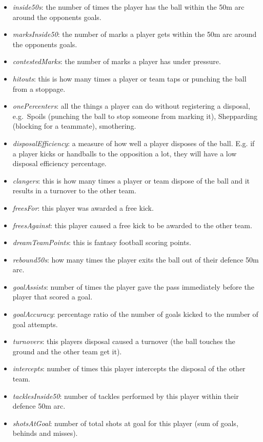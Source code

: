 \begin{itemize}
\item
  \emph{inside50s}: the number of times the player has the ball within the 50m arc around the opponents goals.
\item
  \emph{marksInside50}: the number of marks a player gets within the 50m arc around the opponents goals.
\item
  \emph{contestedMarks}: the number of marks a player has under pressure.
\item
  \emph{hitouts}: this is how many times a player or team taps or punching the ball from a stoppage.
\item
  \emph{onePercenters}: all the things a player can do without registering a disposal, e.g.~Spoils (punching the ball to stop someone from marking it), Shepparding (blocking for a teammate), smothering.
\item
  \emph{disposalEfficiency}: a measure of how well a player disposes of the ball. E.g. if a player kicks or handballs to the opposition a lot, they will have a low disposal efficiency percentage.
\item
  \emph{clangers}: this is how many times a player or team dispose of the ball and it results in a turnover to the other team.
\item
  \emph{freesFor}: this player was awarded a free kick.
\item
  \emph{freesAgainst}: this player caused a free kick to be awarded to the other team.
\item
  \emph{dreamTeamPoints}: this is fantasy football scoring points.
\item
  \emph{rebound50s}: how many times the player exits the ball out of their defence 50m arc.
\item
  \emph{goalAssists}: number of times the player gave the pass immediately before the player that scored a goal.
\item
  \emph{goalAccuracy}: percentage ratio of the number of goals kicked to the number of goal attempts.
\item
  \emph{turnovers}: this players disposal caused a turnover (the ball touches the ground and the other team get it).
\item
  \emph{intercepts}: number of times this player intercepts the disposal of the other team.
\item
  \emph{tacklesInside50}: number of tackles performed by this player within their defence 50m arc.
\item
  \emph{shotsAtGoal}: number of total shots at goal for this player (sum of goals, behinds and misses).

\end{itemize}
